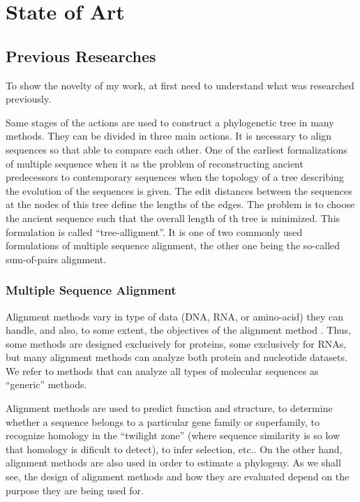 \chapter{State of Art}
\section{Previous Researches}
To show the novelty of my work, at first need to understand what was researched previously.

Same stages of the actions are used to construct a phylogenetic tree in many methods.
They can be divided in three main actions.
It is necessary to align sequences so that able to compare each other. 
One of the earliest formalizations of multiple sequence when it as the 
problem of reconstructing ancient predecessors to contemporary sequences 
when the topology of a tree describing the evolution of the sequences is given.
The edit distances between the sequences at the nodes of this tree define the 
lengths of the edges. The problem is to choose the ancient sequence such that 
the overall length of th tree is minimized. This formulation is called 
``tree-alligment''. It is one of two commonly used formulations of multiple 
sequence alignment, the other one being the so-called sum-of-pairs alignment.

\subsection{Multiple Sequence Alignment}
Alignment methods vary in type of data (DNA, RNA, or amino-acid)
they can handle, and also, to some extent, the objectives of the alignment method \cite{tandy}.
Thus, some methods are designed exclusively for proteins, some exclusively
for RNAs, but many alignment methods can analyze both protein and nucleotide
datasets. We refer to methods that can analyze all types of molecular sequences as
``generic'' methods.

Alignment methods are used to predict function and structure, to determine whether a
sequence belongs to a particular gene family or superfamily, to recognize homology in the
``twilight zone'' (where sequence similarity is so low that homology is dificult to detect),
to infer selection, etc.. On the other hand, alignment methods are also used in order
to estimate a phylogeny. As we shall see, the design of alignment methods and how they
are evaluated depend on the purpose they are being used for.


